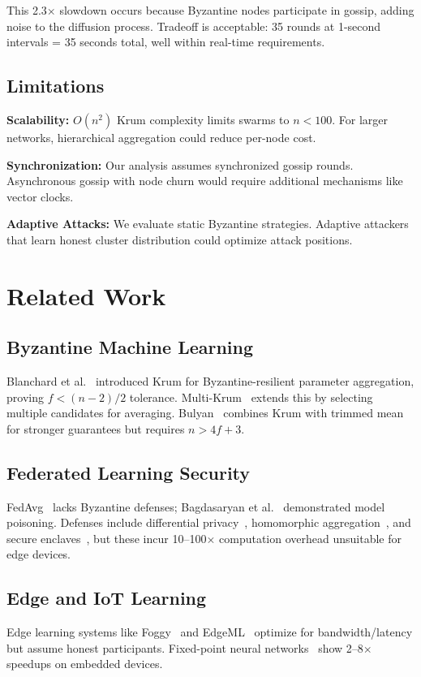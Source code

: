 \documentclass[conference,10pt]{IEEEtran}
\begin{document}
This 2.3$\times$ slowdown occurs because Byzantine nodes participate in gossip, adding noise to the diffusion process. Tradeoff is acceptable: 35 rounds at 1-second intervals = 35 seconds total, well within real-time requirements.

\subsection{Limitations}
\textbf{Scalability:} $O(n^2)$ Krum complexity limits swarms to $n<100$. For larger networks, hierarchical aggregation could reduce per-node cost.

\textbf{Synchronization:} Our analysis assumes synchronized gossip rounds. Asynchronous gossip with node churn would require additional mechanisms like vector clocks.

\textbf{Adaptive Attacks:} We evaluate static Byzantine strategies. Adaptive attackers that learn honest cluster distribution could optimize attack positions.

\section{Related Work}
\label{sec:related}

\subsection{Byzantine Machine Learning}
Blanchard et al.~\cite{blanchard2017machine} introduced Krum for Byzantine-resilient parameter aggregation, proving $f<(n-2)/2$ tolerance. Multi-Krum~\cite{elmhamdi2018hidden} extends this by selecting multiple candidates for averaging. Bulyan~\cite{mhamdi2018hidden} combines Krum with trimmed mean for stronger guarantees but requires $n>4f+3$.

\subsection{Federated Learning Security}
FedAvg~\cite{mcmahan2017communication} lacks Byzantine defenses; Bagdasaryan et al.~\cite{bagdasaryan2020backdoor} demonstrated model poisoning. Defenses include differential privacy~\cite{abadi2016deep}, homomorphic aggregation~\cite{bonawitz2017practical}, and secure enclaves~\cite{mo2021ppfl}, but these incur 10--100$\times$ computation overhead unsuitable for edge devices.

\subsection{Edge and IoT Learning}
Edge learning systems like Foggy~\cite{he2020foggy} and EdgeML~\cite{kumar2017resource} optimize for bandwidth/latency but assume honest participants. Fixed-point neural networks~\cite{courbariaux2016binarized,zhou2016dorefa} show 2--8$\times$ speedups on embedded devices.
\end{document}
